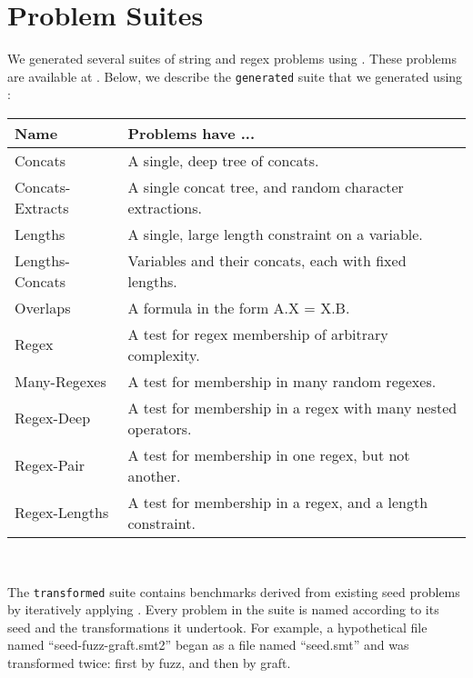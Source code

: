\section{Problem Suites}
\label{sec:problems}

    We generated several suites of string and regex problems using \fuzzer{}. These problems are available at \problemRepo{}. Below, we describe the \texttt{generated} suite that we generated using \generator{}: \\

    \begin{tabular}{|l|l|}
        \hline
        \textbf{Name}    & \textbf{Problems have ...} \\ \hline
        Concats          & A single, deep tree of concats. \\ \hline
        Concats-Extracts & A single concat tree, and random character extractions. \\ \hline
        Lengths          & A single, large length constraint on a variable. \\ \hline
        Lengths-Concats  & Variables and their concats, each with fixed lengths. \\ \hline
        Overlaps         & A formula in the form A.X = X.B. \\ \hline
        Regex            & A test for regex membership of arbitrary complexity. \\ \hline
        Many-Regexes     & A test for membership in many random regexes. \\ \hline
        Regex-Deep       & A test for membership in a regex with many nested operators. \\ \hline
        Regex-Pair       & A test for membership in one regex, but not another. \\ \hline
        Regex-Lengths    & A test for membership in a regex, and a length constraint. \\ \hline
    \end{tabular}
    \hfill \\


    The \texttt{transformed} suite contains benchmarks derived from existing seed problems by iteratively applying \transformer{}.
    Every problem in the suite is named according to its seed and the transformations it undertook. 
    For example, a hypothetical file named ``seed-fuzz-graft.smt2'' began as a file named ``seed.smt'' and was transformed twice:
    first by fuzz, and then by graft. 
    
